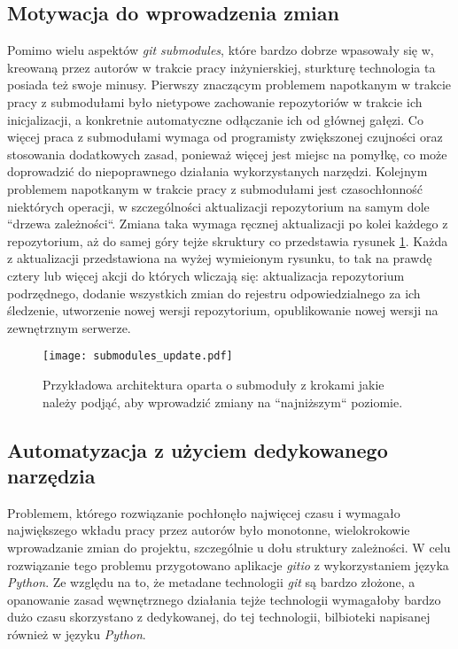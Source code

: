 \subsection{Motywacja do wprowadzenia zmian}

Pomimo wielu aspektów \emph{git submodules}, które bardzo dobrze wpasowały się w, kreowaną przez autorów w trakcie pracy inżynierskiej, sturkturę technologia ta posiada też swoje minusy. Pierwszy znaczącym problemem napotkanym w trakcie pracy z submodułami było nietypowe zachowanie repozytoriów w trakcie ich inicjalizacji, a konkretnie automatyczne odłączanie ich od głównej gałęzi. Co więcej praca z submodułami wymaga od programisty zwiększonej czujności oraz stosowania dodatkowych zasad, ponieważ więcej jest miejsc na pomyłkę, co może doprowadzić do niepoprawnego działania wykorzystanych narzędzi. Kolejnym problemem napotkanym w trakcie pracy z submodułami jest czasochłonność niektórych operacji, w szczególności aktualizacji repozytorium na samym dole ``drzewa zależności``. Zmiana taka wymaga ręcznej aktualizacji po kolei każdego z repozytorium, aż do samej góry tejże skruktury co przedstawia rysunek \ref {fig:submodules_update}. Każda z aktualizacji przedstawiona na wyżej wymieionym rysunku, to tak na prawdę cztery lub więcej akcji do których wliczają się: aktualizacja repozytorium podrzędnego, dodanie wszystkich zmian do rejestru odpowiedzialnego za ich śledzenie, utworzenie nowej wersji repozytorium, opublikowanie nowej wersji na zewnętrznym serwerze.



\clearpage
\begin{figure}[H]
    \centering
    \texttt{[image: submodules\_update.pdf]}
    \caption{Przykładowa architektura oparta o submoduły z krokami jakie należy podjąć, aby wprowadzić zmiany na ``najniższym`` poziomie.}
    \label{fig:submodules_update}
\end{figure}


\subsection{Automatyzacja z użyciem dedykowanego narzędzia}
\label{subsec:gitio}

Problemem, którego rozwiązanie pochłonęło najwięcej czasu i wymagało największego wkładu pracy przez autorów było monotonne, wielokrokowie wprowadzanie zmian do projektu, szczególnie u dołu struktury zależności. W celu rozwiązanie tego problemu przygotowano aplikacje \emph{gitio} z wykorzystaniem języka \emph{Python}. Ze względu na to, że metadane technologii \emph{git} są bardzo złożone, a opanowanie zasad węwnętrznego działania tejże technologii wymagałoby bardzo dużo czasu skorzystano z dedykowanej, do tej technologii, bilbioteki napisanej również w języku \emph{Python}.

